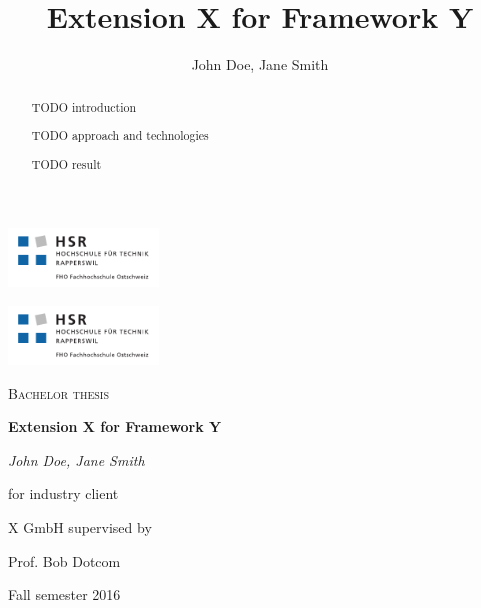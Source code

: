 \documentclass[a4paper]{report}
\title{Extension X for Framework Y}
\author{John Doe, Jane Smith}
\begin{document}
\thispagestyle{empty}

\begin{titlepage}
\centering
\begin{raggedleft}\includegraphics[trim=10 10 10 8, clip=true, width=0.3\textwidth]{img/hsr_logo.pdf}\end{raggedleft}
\begin{raggedright}\hfill\includegraphics[trim=10 10 10 8, clip=true, width=0.3\textwidth]{img/hsr_logo.pdf}\end{raggedright} %

\par\vspace{30mm}
{\scshape\Large Bachelor thesis\par}
\vspace{1.5cm}
{\huge\bfseries Extension X for Framework Y\par}
\vspace{2cm}
{\Large\itshape John Doe, Jane Smith\par}
\vfill
for industry client\par
X GmbH
\vfill
supervised by\par
Prof. Bob Dotcom

\vfill

{\large Fall semester 2016\par}
\end{titlepage}

\begin{abstract}

TODO introduction

TODO approach and technologies

TODO result

\end{abstract}
\end{document}
